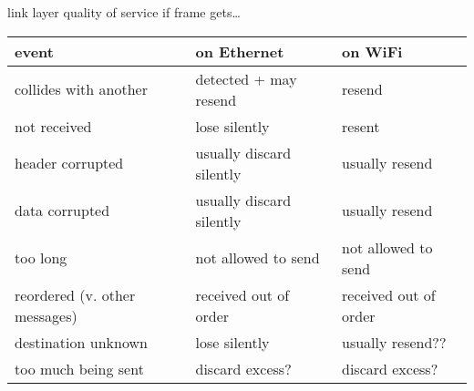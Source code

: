 
\begin{frame}{link layer quality of service}
if frame gets\ldots \\
\small
\begin{tabular}{l|l|l}
event & on Ethernet & on WiFi \\\hline
collides with another & detected + may resend & resend\\
not received & lose silently & resent \\
header corrupted & usually discard silently & usually resend \\
data corrupted & usually discard silently & usually resend \\
too long & not allowed to send & not allowed to send \\
reordered (v. other messages)  & received out of order & received out of order \\
destination unknown & lose silently & usually resend?? \\
too much being sent & discard excess? & discard excess? \\
\end{tabular}
\end{frame}

